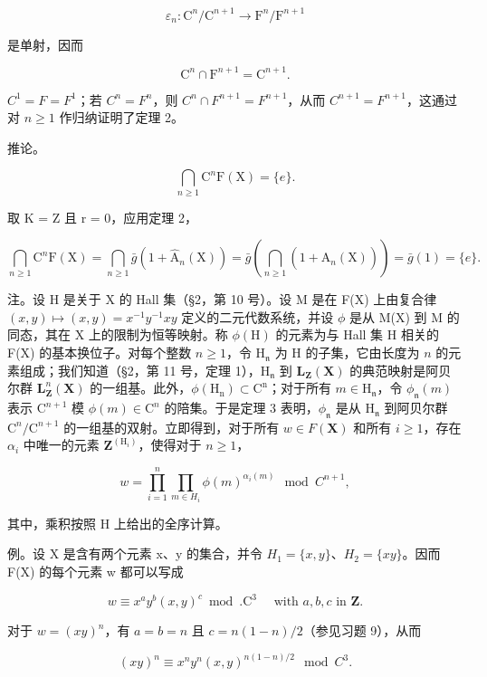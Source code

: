 \[
\varepsilon_ {n} \colon \mathrm{C} ^ {n} / \mathrm{C} ^ {n + 1} \rightarrow \mathrm{F} ^ {n} / \mathrm{F} ^ {n + 1}
\]

是单射，因而

\[
\mathrm{C} ^ {n} \cap \mathrm{F} ^ {n + 1} = \mathrm{C} ^ {n + 1}.
\]

\(C^{1} = F = F^{1}\)；若 \(C^{n} = F^{n}\)，则 \(C^{n} \cap F^{n+1} = F^{n+1}\)，从而 \(C^{n+1} = F^{n+1}\)，这通过对 \(n \geqslant 1\) 作归纳证明了定理 2。

推论。

\[
\bigcap_ {n \geqslant 1} \mathrm{C} ^ {n} \mathrm{F} (\mathrm{X}) = \{e \}.
\]

取 K = Z 且 r = 0，应用定理 2，

\[
\bigcap_ {n \geqslant 1} \mathrm{C} ^ {n} \mathrm{F} (\mathrm{X}) = \bigcap_ {n \geqslant 1} \bar {g} (1 + \hat {\mathrm{A}} _ {n} (\mathrm{X})) = \bar {g} \left(\bigcap_ {n \geqslant 1} (1 + \hat {\mathrm{A}} _ {n} (\mathrm{X}))\right) = \bar {g} (1) = \{e \}.
\]

注。设 H 是关于 X 的 Hall 集（§2，第 10 号）。设 M 是在 F(X) 上由复合律 \((x,y)\mapsto (x,y) = x^{-1}y^{-1}xy\) 定义的二元代数系统，并设 \(\phi\) 是从 M(X) 到 M 的同态，其在 X 上的限制为恒等映射。称 \(\phi (\mathrm{H})\) 的元素为与 Hall 集 H 相关的 F(X) 的基本换位子。对每个整数 \(n\geqslant 1\)，令 \(\mathrm{H}_{\mathfrak{n}}\) 为 H 的子集，它由长度为 \(n\) 的元素组成；我们知道（§2，第 11 号，定理 1），\(\mathrm{H}_{\mathfrak{n}}\) 到 \(\mathbf{L}_{\mathbf{Z}}(\mathbf{X})\) 的典范映射是阿贝尔群 \(\mathbf{L}_{\mathbf{Z}}^{n} (\mathbf{X})\) 的一组基。此外，\(\phi (\mathrm{H_n})\subset \mathrm{C^n}\)；对于所有 \(m\in \mathrm{H}_{\mathfrak{n}}\)，令 \(\phi_{\mathfrak{n}}(m)\) 表示 \(\mathrm{C}^{n + 1}\) 模 \(\phi (m)\in \mathrm{C}^n\) 的陪集。于是定理 3 表明，\(\phi_{\mathfrak{n}}\) 是从 \(\mathrm{H}_{\mathfrak{n}}\) 到阿贝尔群 \(\mathrm{C}^n /\mathrm{C}^{n + 1}\) 的一组基的双射。立即得到，对于所有 \(w\in F(\mathbf{X})\) 和所有 \(i\geqslant 1\)，存在 \(\alpha_{i}\) 中唯一的元素 \(\mathbf{Z}^{(\mathrm{H}_{i})}\)，使得对于 \(n\geqslant 1\)，

\[
w = \prod_ {i = 1} ^ {n} \prod_ {m \in H _ {i}} \phi (m) ^ {\alpha_ {i} (m)} \mod C ^ {n + 1},\tag{4}
\]

其中，乘积按照 H 上给出的全序计算。

例。设 X 是含有两个元素 x、y 的集合，并令 \(H_{1} = \{x, y\}\)、\(H_{2} = \{xy\}\)。因而 F(X) 的每个元素 w 都可以写成

\[
w \equiv x ^ {a} y ^ {b} (x, y) ^ {c} \bmod . \mathrm{C} ^ {3} \quad \text { with } a, b, c \text { in } \mathbf {Z}.
\]

对于 \(w = (xy)^n\)，有 \(a = b = n\) 且 \(c = n(1 - n)/2\)（参见习题 9），从而

\[
(x y) ^ {n} \equiv x ^ {n} y ^ {n} (x, y) ^ {n (1 - n) / 2} \mod C ^ {3}.
\]

